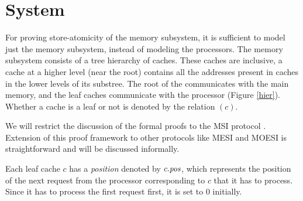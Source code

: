 \section{System}
\label{sec:System}

For proving store-atomicity of the memory subsystem, it is sufficient to model
just the memory subsystem, instead of modeling the processors.
The memory subsystem consists of a tree hierarchy of caches. These
caches are inclusive, \ie a cache at a higher level (near the root) contains
all the addresses present in caches in the lower levels of its substree. The
root of the communicates with the main memory, and the leaf caches communicate
with the processor (Figure \ref{hier}). Whether a cache is a leaf or not is
denoted by the relation \leaf$(c)$.

We will restrict the discussion of the formal proofs to the MSI protocol
\cite{MSI}. Extension of this proof framework to other protocols like MESI and
MOESI is straightforward and will be discussed informally.

Each leaf cache $c$ has a \emph{position} denoted by $c.\textit{pos}$, which represents
the position of the next request from the processor corresponding to $c$ that
it has to process. Since it has to process the first request first, it is set
to $0$ initially.

